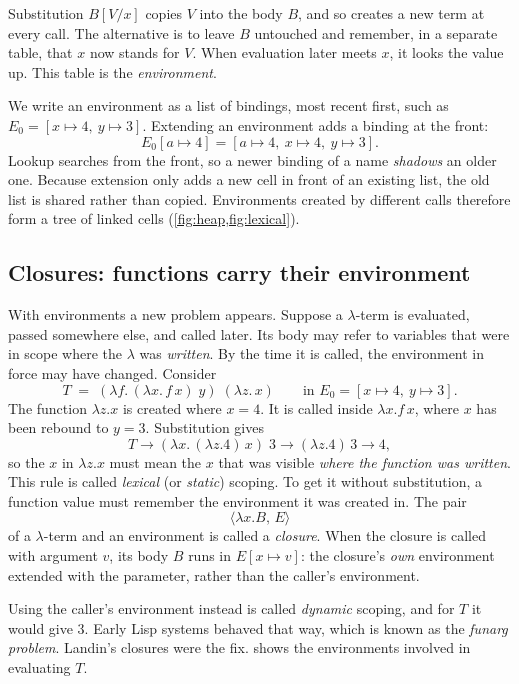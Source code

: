 \documentclass[11pt,a4paper]{article}
\newcommand{\cl}[2]{\langle #1,\, #2\rangle}
\theoremstyle{definition}
\theoremstyle{plain}
\begin{document}
Substitution $B[V/x]$ copies $V$ into the body $B$, and so creates a new term
at every call. The alternative is to leave $B$ untouched and remember, in a
separate table, that $x$ now stands for $V$. When evaluation later meets
$x$, it looks the value up. This table is the \emph{environment}.

We write an environment as a list of bindings, most recent first, such as
$E_0 = [x \mapsto 4,\ y \mapsto 3]$. Extending an environment adds a binding at
the front:
\[
  E_0[a\mapsto 4] = [a\mapsto 4,\ x\mapsto 4,\ y\mapsto 3].
\]
Lookup searches from the front, so a newer binding of a name \emph{shadows}
an older one. Because extension only adds a new cell in front of an existing
list, the old list is shared rather than copied. Environments created by
different calls therefore form a tree of linked cells
(\cref{fig:heap,fig:lexical}).

\subsection{Closures: functions carry their environment}

With environments a new problem appears. Suppose a $\lambda$-term is
evaluated, passed somewhere else, and called later. Its body may refer to
variables that were in scope where the $\lambda$ was \emph{written}. By the
time it is called, the environment in force may have changed. Consider
\begin{equation}\label{eq:lexical}
  T \;=\; (\lambda f.\,(\lambda x.\,f\,x)\;y)\;(\lambda z.\,x)
  \qquad\text{in } E_0 = [x\mapsto 4,\ y\mapsto 3].
\end{equation}
The function $\lambda z.x$ is created where $x = 4$. It is called inside
$\lambda x.f\,x$, where $x$ has been rebound to $y = 3$. Substitution gives
\[
  T \to (\lambda x.\,(\lambda z.4)\,x)\;3 \to (\lambda z.4)\,3 \to 4,
\]
so the $x$ in $\lambda z.x$ must mean the $x$ that was visible \emph{where the
function was written}. This rule is called \emph{lexical} (or \emph{static})
scoping. To get it without substitution, a function value must remember the
environment it was created in. The pair
\[
  \cl{\lambda x.B}{E}
\]
of a $\lambda$-term and an environment is called a \emph{closure}. When the
closure is called with argument $v$, its body $B$ runs in $E[x\mapsto v]$:
the closure's \emph{own} environment extended with the parameter, rather than
the caller's environment.

Using the caller's environment instead is called \emph{dynamic} scoping, and
for $T$ it would give $3$. Early Lisp systems behaved that way, which is
known as the \emph{funarg problem}. Landin's closures were the fix.
 shows the environments involved in evaluating $T$.
\end{document}
